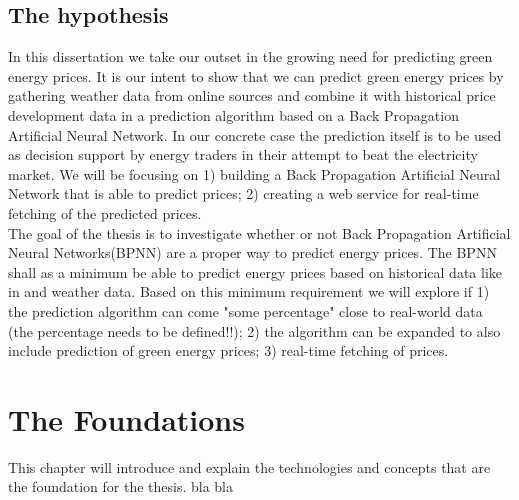 \documentclass[twoside,11pt,openright]{report}
\begin{document}
\section{The hypothesis}
In this dissertation we take our outset in the growing need for predicting green energy prices. It is our intent to show that we can predict green energy prices by gathering weather data from online sources and combine it with historical price development data in a prediction algorithm based on a Back Propagation Artificial Neural Network. In our concrete case the prediction itself is to be used as decision support by energy traders in their attempt to beat the electricity market. We will be focusing on 1) building a Back Propagation Artificial Neural Network that is able to predict prices; 2) creating a web service for real-time fetching of the predicted prices. 
\\[0.5cm] 
The goal of the thesis is to investigate whether or not Back Propagation Artificial Neural Networks(BPNN) are a proper way to predict energy prices. The BPNN shall as a minimum be able to predict energy prices based on historical data like in \cite{2} and weather data. Based on this minimum requirement we will explore if 1) the prediction algorithm can come "some percentage" close to real-world data (the percentage needs to be defined!!); 2) the algorithm can be expanded to also include prediction of green energy prices; 3) real-time fetching of prices.



\chapter{The Foundations}
This chapter will introduce and explain the technologies and concepts that are the foundation for the thesis. bla bla
\label{ch:foundations}
\end{document}
